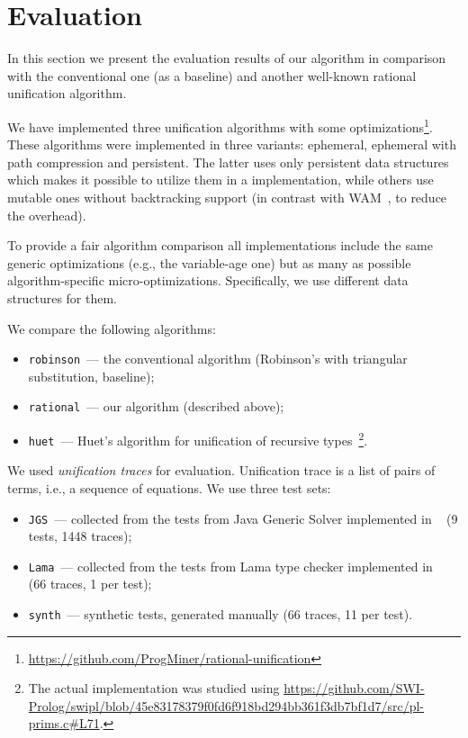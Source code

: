 \section{Evaluation}

In this section we present the evaluation results of our algorithm in comparison with the conventional one (as a baseline) and another well-known rational unification algorithm.

We have implemented three unification algorithms with some optimizations\footnote{\url{https://github.com/ProgMiner/rational-unification}}.
These algorithms were implemented in three variants: ephemeral, ephemeral with path compression and persistent.
The latter uses only persistent data structures which makes it possible to utilize them in a \miniKanren implementation, while others use mutable ones without backtracking support (in contrast with WAM~\cite{warren1983abstract}, to reduce the overhead).

To provide a fair algorithm comparison all implementations include the same generic optimizations (e.g., the variable-age one) but as many as possible algorithm-specific micro-optimizations. Specifically, we use different data structures for them.

We compare the following algorithms:

\begin{itemize}
    \item \texttt{robinson}~--- the conventional algorithm (Robinson's with triangular substitution, baseline);
    \item \texttt{rational}~--- our algorithm (described above);
    \item \texttt{huet}~--- Huet's algorithm for unification of recursive types~\cite{huet1976resolution}\footnote{The actual implementation was studied using \url{https://github.com/SWI-Prolog/swipl/blob/45e83178379f0fd6f918bd294bb361f3db7bf1d7/src/pl-prims.c\#L71}.}.
\end{itemize}

We used \emph{unification traces} for evaluation. Unification trace is a list of pairs of terms, i.e., a sequence of equations. We use three test sets:

\begin{itemize}
    \item \texttt{JGS}~--- collected from the tests from Java Generic Solver implemented in \OCanren~\cite{lozov2023relational} (9 tests, 1448 traces);
    \item \texttt{Lama}~--- collected from the tests from Lama type checker implemented in \OCanren~\cite{domoratskiy2024relational} (66 traces, 1 per test);
    \item \texttt{synth}~--- synthetic tests, generated manually (66 traces, 11 per test).
\end{itemize}

